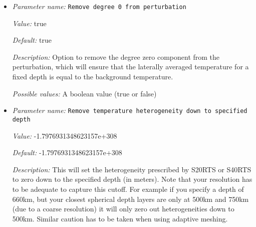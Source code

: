 \begin{itemize}
{\it Value:} 1600.0


{\it Default:} 1600.0


{\it Description:} The reference temperature that is perturbed by the spherical harmonic functions. Only used in incompressible models.


{\it Possible values:} A floating point number $v$ such that $0 \leq v \leq \text{MAX\_DOUBLE}$
\item {\it Parameter name:} {\tt Remove degree 0 from perturbation}
\label{parameters:Initial temperature model/S40RTS perturbation/Remove degree 0 from perturbation}
\label{parameters:Initial_20temperature_20model/S40RTS_20perturbation/Remove_20degree_200_20from_20perturbation}


{\it Value:} true


{\it Default:} true


{\it Description:} Option to remove the degree zero component from the perturbation, which will ensure that the laterally averaged temperature for a fixed depth is equal to the background temperature.


{\it Possible values:} A boolean value (true or false)
\item {\it Parameter name:} {\tt Remove temperature heterogeneity down to specified depth}
\label{parameters:Initial temperature model/S40RTS perturbation/Remove temperature heterogeneity down to specified depth}
\label{parameters:Initial_20temperature_20model/S40RTS_20perturbation/Remove_20temperature_20heterogeneity_20down_20to_20specified_20depth}


{\it Value:} -1.7976931348623157e+308


{\it Default:} -1.7976931348623157e+308


{\it Description:} This will set the heterogeneity prescribed by S20RTS or S40RTS to zero down to the specified depth (in meters). Note that your resolution has to be adequate to capture this cutoff. For example if you specify a depth of 660km, but your closest spherical depth layers are only at 500km and 750km (due to a coarse resolution) it will only zero out heterogeneities down to 500km. Similar caution has to be taken when using adaptive meshing.



\end{itemize}
